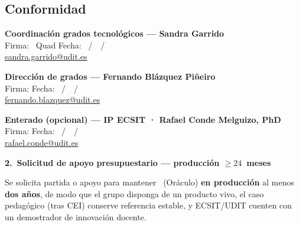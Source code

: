 \documentclass[11pt,a4paper]{scrartcl}
\newcommand{\AnnexTitle}[1]{%
  \clearpage
  \LogoRow
  \begin{center}{\Large\sffamily\bfseries #1}\end{center}
  \vspace{0.4em}
  \noindent{\color{rulegray}\hrule height 0.4pt}
  \vspace{0.5em}
}
\begin{document}
\subsection*{Conformidad}
\vspace{0.6em}
\noindent\textbf{Coordinación grados tecnológicos --- Sandra Garrido}\\[0.35em]
Firma: \hrulefill\ Quad Fecha: \underline{\hspace{1.1cm}}~/~\underline{\hspace{1.1cm}}~/~\underline{\hspace{2cm}}\\
{\scriptsize\href{mailto:sandra.garrido@udit.es}{sandra.garrido@udit.es}}

\vspace{0.9em}
\noindent\textbf{Dirección de grados --- Fernando Blázquez Piñeiro}\\[0.35em]
Firma: \hrulefill\quad Fecha: \underline{\hspace{1.1cm}}~/~\underline{\hspace{1.1cm}}~/~\underline{\hspace{2cm}}\\
{\scriptsize\href{mailto:fernando.blazquez@udit.es}{fernando.blazquez@udit.es}}

\vspace{0.9em}
\noindent\textbf{Enterado (opcional) --- IP ECSIT · Rafael Conde Melguizo, PhD}\\[0.35em]
Firma: \hrulefill\quad Fecha: \underline{\hspace{1.1cm}}~/~\underline{\hspace{1.1cm}}~/~\underline{\hspace{2cm}}\\
{\scriptsize\href{mailto:rafael.conde@udit.es}{rafael.conde@udit.es}}

\vspace{0.5em}

\AnnexTitle{2.\ Solicitud de apoyo presupuestario --- producción $\geq 24$~meses}

\noindent Se solicita partida o apoyo para mantener \TTODfull\ (Oráculo)
\textbf{en producción} al menos \textbf{dos años}, de modo que el grupo disponga
de un producto vivo, el caso pedagógico (tras CEI) conserve referencia estable, y
ECSIT/UDIT cuenten con un demostrador de innovación docente.
\end{document}

